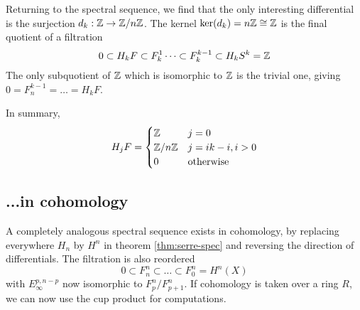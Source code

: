 \begin{example}
Returning to the spectral sequence, we find that the only interesting differential is the surjection $d_k:\mathbb{Z}\rightarrow \mathbb{Z}/n\mathbb{Z}$. The kernel $\text{ker}(d_k)=n\mathbb{Z}\cong \mathbb{Z}$ is the final quotient of a filtration
$$0\subset H_kF\subset F^{1}_k \dots \subset F^{k-1}_k\subset H_kS^k=\mathbb{Z}$$
The only subquotient of $\mathbb{Z}$ which is isomorphic to $\mathbb{Z}$ is the trivial one, giving $0=F^{k-1}_n=\dots=H_kF$. 

In summary,
$$H_jF=\begin{cases} 
      \mathbb{Z}  & j=0\\
      \mathbb{Z}/n\mathbb{Z} & j= ik-i, i>0 \\
      0 & \text{otherwise}
   \end{cases}
$$

\end{example}

\subsection{...in cohomology}
A completely analogous spectral sequence exists in cohomology, by replacing everywhere $H_n$ by $H^n$ in theorem \ref{thm:serre-spec} and reversing the direction of differentials. The filtration is also reordered
$$0\subset F_n^n\subset \dots \subset F^n_0=H^n(X)$$ with $E^{p,n-p}_\infty$ now isomorphic to $F^n_p/F^n_{p+1}$. If cohomology is taken over a ring $R$, we can now use the cup product for computations. 